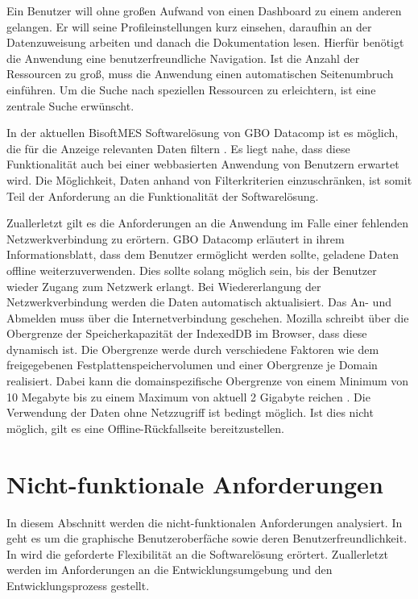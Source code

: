 Ein Benutzer will ohne großen Aufwand von einen Dashboard zu einem anderen gelangen. Er will seine Profileinstellungen
kurz einsehen, daraufhin an der Datenzuweisung arbeiten und danach die Dokumentation lesen.
Hierfür benötigt die Anwendung eine benutzerfreundliche Navigation. Ist die Anzahl der Ressourcen zu 
groß, muss die Anwendung einen automatischen Seitenumbruch einführen. Um die Suche nach speziellen
Ressourcen zu erleichtern, ist eine zentrale Suche erwünscht.

In der aktuellen BisoftMES Softwarelösung von GBO Datacomp ist es möglich, die für die Anzeige relevanten Daten filtern \cite[S. 14]{BisoftMESHandbuch}.
Es liegt nahe, dass diese Funktionalität auch bei einer webbasierten Anwendung von Benutzern erwartet wird. Die Möglichkeit, Daten
anhand von Filterkriterien einzuschränken, ist somit Teil der Anforderung an die Funktionalität der Softwarelösung.

Zuallerletzt gilt es die Anforderungen an die Anwendung im Falle einer fehlenden Netzwerkverbindung
zu erörtern. GBO Datacomp erläutert in ihrem Informationsblatt, dass dem Benutzer
ermöglicht werden sollte, geladene Daten offline weiterzuverwenden. Dies sollte solang möglich sein,
bis der Benutzer wieder Zugang zum Netzwerk erlangt. Bei Wiedererlangung der Netzwerkverbindung werden
die Daten automatisch aktualisiert. Das An- und Abmelden muss über die Internetverbindung
geschehen. Mozilla schreibt über die Obergrenze der Speicherkapazität der IndexedDB im Browser,
dass diese dynamisch ist. Die Obergrenze werde durch verschiedene Faktoren wie dem freigegebenen
Festplattenspeichervolumen und einer Obergrenze je Domain realisiert. Dabei kann die domainspezifische
Obergrenze von einem Minimum von 10 Megabyte bis zu einem Maximum von aktuell 2 Gigabyte reichen \cite{MozillaStorageLimit}.
Die Verwendung der Daten ohne Netzzugriff ist bedingt möglich. Ist dies nicht möglich, gilt es
eine Offline-Rückfallseite bereitzustellen.

\section{Nicht-funktionale Anforderungen}
\label{sec:nichtfunktionaleanforderungen}
In diesem Abschnitt werden die nicht-funktionalen Anforderungen analysiert.
In  geht es um die graphische Benutzeroberfäche sowie
deren Benutzerfreundlichkeit. In  wird die geforderte
Flexibilität an die Softwarelösung erörtert. Zuallerletzt werden im 
Anforderungen an die Entwicklungsumgebung und den Entwicklungsprozess gestellt.

